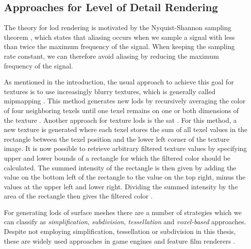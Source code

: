 \subsection{Approaches for Level of Detail Rendering}
The theory for \ac{lod} rendering is motivated by the Nyquist-Shannon sampling theorem \cite{shannonsampling}, which states that aliasing occurs when we sample a signal with less than twice the maximum frequency of the signal.
When keeping the sampling rate constant, we can therefore avoid aliasing by reducing the maximum frequency of the signal.

As mentioned in the introduction, the usual approach to achieve this goal for textures is to use increasingly blurry textures, which is generally called mipmapping \cite{mipmapping}.
This method generates new \acsp{lod} by recursively averaging the color of four neighboring texels until one texel remains on one or both dimensions of the texture \cite{mipmapping}.
Another approach for texture \acsp{lod} is the \ac{sat} \cite{crow_summed_area_tables}.
For this method, a new texture is generated where each texel stores the sum of all texel values in the rectangle between the texel position and the lower left corner of the texture image.
It is now possible to retrieve arbitrary filtered texture values by specifying upper and lower bounds of a rectangle for which the filtered color should be calculated.
The summed intensity of the rectangle is then given by adding the value on the bottom left of the rectangle to the value on the top right, minus the values at the upper left and lower right.
Dividing the summed intensity by the area of the rectangle then gives the filtered color \cite{crow_summed_area_tables}.

For generating \acsp{lod} of surface meshes there are a number of strategies which we can classify as \textit{simplification}, \textit{subdivision}, \textit{tessellation} and \textit{voxel-based} approaches.
Despite not employing simplification, tessellation or subdivision in this thesis, these are widely used approaches in game engines \cite{niessner_tessellation} and feature film renderers \cite{arnold}.

